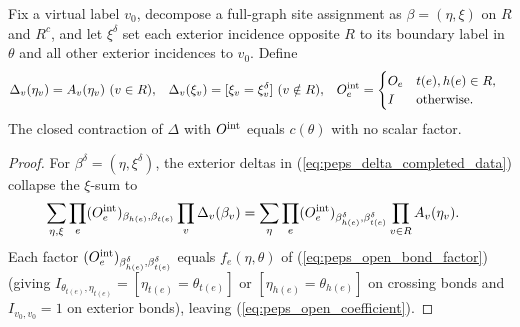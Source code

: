\begin{lemma}
    \label{thm:peps_labelled_open_delta}
    \leanok
    Fix a virtual label $v_0$, decompose a full-graph site assignment as
    $\beta=(\eta,\xi)$ on $R$ and $R^c$, and let $\xi^\delta$ set each
    exterior incidence opposite $R$ to its boundary label in $\theta$ and
    all other exterior incidences to $v_0$. Define
    \begin{align}
        \Delta_v(\eta_v) & =A_v(\eta_v)\ (v\in R),             &
        \Delta_v(\xi_v)  & =[\xi_v=\xi^\delta_v]\ (v\notin R), &
        O^{\rm int}_e    & =
        \begin{cases}
            O_e & t(e),h(e)\in R,   \\
            I   & \text{otherwise}.
        \end{cases}
        \label{eq:peps_delta_completed_data}
    \end{align}
    The closed contraction of $\Delta$ with $O^{\rm int}$ equals $c(\theta)$
    with no scalar factor.
\end{lemma}
\begin{proof}\leanok
    For $\beta^\delta=(\eta,\xi^\delta)$, the exterior deltas in
    (\ref{eq:peps_delta_completed_data}) collapse the $\xi$-sum to
    \begin{align}
        \sum_{\eta,\xi}\prod_e(O^{\rm int}_e)_{\beta_{h(e)},\beta_{t(e)}}
        \prod_v\Delta_v(\beta_v)
         & =\sum_\eta\prod_e(O^{\rm int}_e)_{\beta^\delta_{h(e)},\beta^\delta_{t(e)}}
        \prod_{v\in R}A_v(\eta_v).
        \notag
    \end{align}
    Each factor $(O^{\rm int}_e)_{\beta^\delta_{h(e)},\beta^\delta_{t(e)}}$
    equals $f_e(\eta,\theta)$ of (\ref{eq:peps_open_bond_factor}) (giving
    $I_{\theta_{t(e)},\eta_{t(e)}}=[\eta_{t(e)}=\theta_{t(e)}]$ or
    $[\eta_{h(e)}=\theta_{h(e)}]$ on crossing bonds and $I_{v_0,v_0}=1$ on
    exterior bonds), leaving (\ref{eq:peps_open_coefficient}).
\end{proof}

